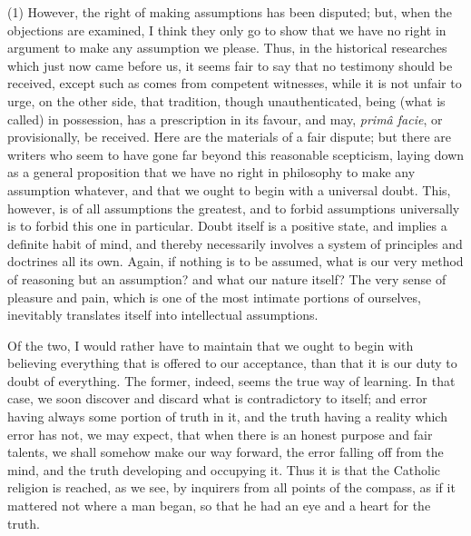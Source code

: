(1) However, the right of making assumptions has been disputed;
but, when the objections are examined, I think they only go to show
that we have no right in argument to make any assumption we please.
Thus, in the historical researches which just now came before us, it
seems fair to say that no testimony should be received, except such as
comes from competent witnesses, while it is not unfair to urge, on the
other side, that tradition, though unauthenticated, being (what
is called) in possession, has a prescription in its favour, and may, \emph{primâ
facie}, or provisionally, be received. Here are the materials of a
fair dispute; but there are writers who seem to have gone far beyond
this reasonable scepticism, laying down as a general proposition that
we have no right in philosophy to make any assumption whatever, and
that we ought to begin with a universal doubt. This, however, is of
all assumptions the greatest, and to forbid assumptions universally is
to forbid this one in particular. Doubt itself is a positive state,
and implies a definite habit of mind, and thereby necessarily involves
a system of principles and doctrines all its own. Again, if nothing is
to be assumed, what is our very method of reasoning but an assumption?
and what our nature itself? The very sense of pleasure and pain, which
is one of the most intimate portions of ourselves, inevitably
translates itself into intellectual assumptions.

Of the two, I would rather have to maintain that we ought to begin
with believing everything that is offered to our acceptance, than that
it is our duty to doubt of everything. The former, indeed, seems the
true way of learning. In that case, we soon discover and discard what
is contradictory to itself; and error having always some portion of
truth in it, and the truth having a reality which error has not, we
may expect, that when there is an honest purpose and fair talents, we
shall somehow make our way forward, the error falling off from the
mind, and the truth developing and occupying it. Thus it is that the
Catholic religion is reached, as we see, by inquirers from all
points of the compass, as if it mattered not where a man began, so
that he had an eye and a heart for the truth.

